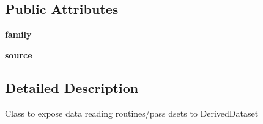 \subsection*{Public Attributes}
\begin{DoxyCompactItemize}
\item 
\hypertarget{classseren3_1_1core_1_1serensource_1_1SerenSource_a16c5ce2d668a10ae3fb3fbdf5a5f0627}{
{\bfseries family}}
\label{classseren3_1_1core_1_1serensource_1_1SerenSource_a16c5ce2d668a10ae3fb3fbdf5a5f0627}

\item 
\hypertarget{classseren3_1_1core_1_1serensource_1_1SerenSource_a0207baac86e29d983657c0e65fefa138}{
{\bfseries source}}
\label{classseren3_1_1core_1_1serensource_1_1SerenSource_a0207baac86e29d983657c0e65fefa138}

\end{DoxyCompactItemize}


\subsection{Detailed Description}
\begin{DoxyVerb}
Class to expose data reading routines/pass dsets to DerivedDataset
\end{DoxyVerb}
 


